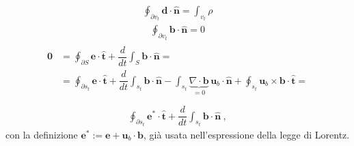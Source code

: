 \documentclass[letterpaper,10pt,italian]{jupyterBook}
\begin{document}
\begin{equation*}
\begin{split}
    \oint_{\partial v_t} \mathbf{d} \cdot \mathbf{\hat{n}} = \int_{v_t} \rho
\end{split}
\end{equation*}
\sphinxAtStartPar
{}
\begin{equation*}
\begin{split}
    \oint_{\partial v_t} \mathbf{b} \cdot \mathbf{\hat{n}} = 0
\end{split}
\end{equation*}
\sphinxAtStartPar
{}
\begin{equation*}
\begin{split}\begin{aligned}
   \mathbf{0} & = \oint_{\partial S} \mathbf{e} \cdot \hat{\mathbf{t}} + \dfrac{d}{dt} \int_{S} \mathbf{b} \cdot \hat{\mathbf{n}} = \\
    & = \oint_{\partial s_t} \mathbf{e} \cdot \hat{\mathbf{t}} + \dfrac{d}{dt} \int_{s_t} \mathbf{b} \cdot \hat{\mathbf{n}} - \int_{s_t} \underbrace{\nabla \cdot \mathbf{b}}_{=0} \, \mathbf{u}_b \cdot \hat{\mathbf{n}} + \oint_{s_t} \mathbf{u}_b \times \mathbf{b} \cdot \hat{\mathbf{t}} =  \\
\end{aligned}\end{split}
\end{equation*}\begin{equation*}
\begin{split}
    \oint_{\partial s_t} \mathbf{e}^* \cdot \hat{\mathbf{t}} + \dfrac{d}{dt} \int_{s_t} \mathbf{b} \cdot \hat{\mathbf{n}} \ ,
\end{split}
\end{equation*}
\sphinxAtStartPar
con la definizione \(\mathbf{e}^* := \mathbf{e} + \mathbf{u}_b \cdot \mathbf{b}\), già usata nell’espressione della legge di Lorentz.
\end{document}
